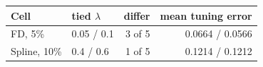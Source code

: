 \begin{tabular}{llrr}\toprule
Cell & tied $\lambda$ & differ & mean tuning error \\\midrule
FD, 5\% & 0.05 / 0.1 & 3 of 5 & 0.0664 / 0.0566 \\
Spline, 10\% & 0.4 / 0.6 & 1 of 5 & 0.1214 / 0.1212 \\
\bottomrule\end{tabular}
